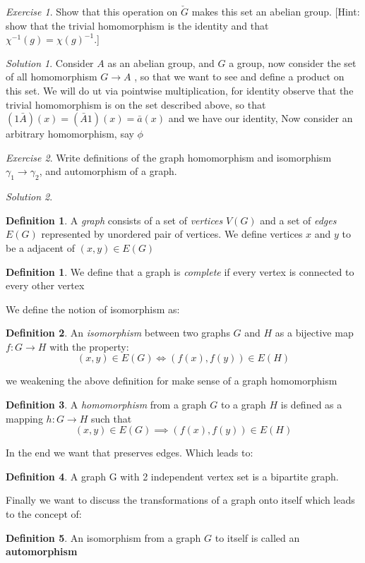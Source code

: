 \documentclass[notitlepage]{article}
\theoremstyle{definition}
\newtheorem{define}{Definition}[section]
\newtheorem{defn}{Definition}[section]
\theoremstyle{remark}
\newtheorem{exc}{Exercise}
\newtheorem*{sol}{Solution}
\begin{document}
\begin{exc}
	Show that this operation on $  \check{G} $ makes this set an abelian group. [Hint: show that the trivial homomorphism is the identity and that $ \chi^{-1}(g) = \chi(g)^{-1}. $]
\end{exc}

\begin{sol}
	Consider $ A $ as an abelian group, and $ G $ a group, now consider the set of all homomorphism $ G \rightarrow A $ , so that we want to see and define a product on this set. We will do ut via pointwise multiplication, for identity observe that the trivial homomorphism is on the set described above, so that $ (1 \bar{A})(x) = (\bar{A} 1 )(x) = \bar{a}(x) $ and we have our identity, Now consider an arbitrary homomorphism, say $ \phi $
\end{sol}

\begin{exc}
	Write definitions of the graph homomorphism and isomorphism $ \gamma_1 \rightarrow \gamma_2 $, and automorphism of a graph.
\end{exc}
\begin{sol}
	\begin{defn}
		A \textit{graph } consists of a set of \textit{vertices } $ V(G) $ and a set of \textit{edges} $ E(G) $ represented by unordered pair of vertices. We define vertices $ x $ and $ y $ to be a adjacent of $ (x,y) \in E(G) $
	\end{defn}
	\begin{define}
		We define that a graph is \textit{complete} if every vertex is connected to every other vertex 
	\end{define}
	We define the notion of isomorphism as:
	\begin{defn}
		An \textit{isomorphism} between two graphs $ G $ and $ H $ as a bijective map $ f: G \rightarrow H $ with the property:
		\[ (x,y) \in E(G) \iff (f(x),f(y)) \in E(H) \]
	\end{defn}
	we weakening the above definition for make sense of a graph homomorphism 
	\begin{defn}
		A \textit{homomorphism} from a graph $ G $ to a graph $ H $ is defined as a mapping $ h: G \rightarrow H $ such that
		\[  (x,y) \in E(G) \implies (f(x),f(y)) \in E(H) \]
	\end{defn}
	In the end we want that preserves edges. Which leads to:
	\begin{defn}
		A graph G with 2 independent vertex set is a bipartite graph. 
	\end{defn}
	Finally we want to discuss the transformations of a graph onto itself which leads to the concept of:
	\begin{defn}
		An isomorphism from a graph $ G $ to itself is called an \textbf{automorphism}
	\end{defn}
\end{sol}
\end{document}
